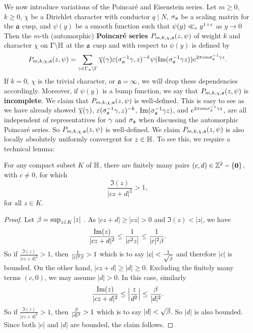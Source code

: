     We now introduce variations of the Poincar\'e and Eisenstein series. Let $m \ge 0$, $k \ge 0$, $\chi$ be a Dirichlet character with conductor $q \mid N$, $\sigma_{\mathfrak{a}}$ be a scaling matrix for the $\mathfrak{a}$ cusp, and $\psi(y)$ be a smooth function such that $\psi(y) \ll_{\varepsilon} y^{1+\varepsilon}$ as $y \to 0$ Then the $m$-th (automorphic) \textbf{Poincar\'e series} $P_{m,k,\chi,\mathfrak{a}}(z,\psi)$ of weight $k$ and character $\chi$ on $\Gamma\backslash\mathbb{H}$ at the $\mathfrak{a}$ cusp and with respect to $\psi(y)$ is defined by
    \[
      P_{m,k,\chi,\mathfrak{a}}(z,\psi) = \sum_{\gamma \in \Gamma_{\mathfrak{a}}\backslash\Gamma}\overline{\chi}(\gamma)\varepsilon(\sigma_{\mathfrak{a}}^{-1}\gamma,z)^{-k}\psi(\mathrm{Im}(\sigma_{\mathfrak{a}}^{-1}\gamma z))e^{2\pi im\sigma_{\mathfrak{a}}^{-1}\gamma z}.
    \]
    If $k = 0$, $\chi$ is the trivial character, or $\mathfrak{a} = \infty$, we will drop these dependencies accordingly. Moreover, if $\psi(y)$ is a bump function, we say that $P_{m,k,\chi,\mathfrak{a}}(z,\psi)$ is \textbf{incomplete}. We claim that $P_{m,k,\chi,\mathfrak{a}}(z,\psi)$ is well-defined. This is easy to see as we have already showed $\overline{\chi}(\gamma)$, $\varepsilon(\sigma_{\mathfrak{a}}^{-1}\gamma,z)^{-k}$, $\mathrm{Im}(\sigma_{\mathfrak{a}}^{-1}\gamma z)$, and $e^{2\pi im\sigma_{\mathfrak{a}}^{-1}\gamma z}$, are all independent of representatives for $\gamma$ and $\sigma_{\mathfrak{a}}$ when discussing the automorphic Poincar\'e series. So $P_{m,k,\chi,\mathfrak{a}}(z,\psi)$ is well-defined. We claim $P_{m,k,\chi,\mathfrak{a}}(z,\psi)$ is also locally absolutely uniformly convergent for $z \in \mathbb{H}$. To see this, we require a technical lemma:

    \begin{lemma}\label{lem:finitely_many_pairs_with_size_larger_than_one}
      For any compact subset $K$ of $\mathbb{H}$, there are finitely many pairs $(c,d) \in \mathbb{Z}^{2}-\{\mathbf{0}\}$, with $c \neq 0$, for which
      \[
        \frac{\Im(z)}{|cz+d|^{2}} > 1,
      \]
      for all $z \in K$.
      \end{lemma}
      \begin{proof}
      Let $\beta = \sup_{z \in K}|z|$ . As $|cz+d| \ge |cz| > 0$ and $\Im(z) < |z|$, we have
      \[
        \frac{\mathrm{Im}(z)}{|cz+d|^{2}} \le \frac{1}{|c^{2}z|} \le \frac{1}{|c|^{2}\beta}.
      \]
      So if $\frac{\Im(z)}{|cz+d|^{2}} > 1$, then $\frac{1}{|c|^{2}\beta} > 1$ which is to say $|c| < \frac{1}{\sqrt{\beta}}$ and therefore $|c|$ is bounded. On the other hand, $|cz+d| \ge |d| \ge 0$. Excluding the finitely many terms $(c,0)$, we may assume $|d| > 0$. In this case, similarly  
      \[
        \frac{\mathrm{Im}(z)}{|cz+d|^{2}} \le \left|\frac{z}{d^{2}}\right| \le \frac{\beta}{|d|^{2}}.
      \]
      So if $\frac{\Im(z)}{|cz+d|^{2}} > 1$, then $\frac{\beta}{|d|^{2}}> 1$ which is to say $|d| < \sqrt{\beta}$. So $|d|$ is also bounded. Since both $|c|$ and $|d|$ are bounded, the claim follows.
    \end{proof}

